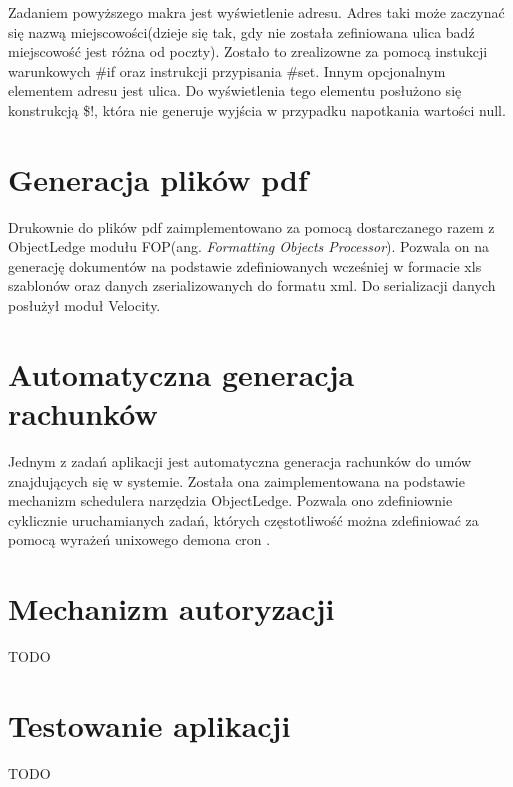 Zadaniem powyższego makra jest wyświetlenie adresu. Adres taki może zaczynać się nazwą miejscowości(dzieje się tak, gdy nie została zefiniowana ulica badź miejscowość jest różna od poczty). Zostało to zrealizowne za pomocą instukcji warunkowych \#if oraz instrukcji przypisania \#set. Innym opcjonalnym elementem adresu jest ulica. Do wyświetlenia tego elementu posłużono się konstrukcją \$!, która nie generuje wyjścia w przypadku napotkania wartości null.

\section[Generacja plików pdf][Generacja plików pdf]{Generacja plików pdf}
Drukownie do plików pdf zaimplementowano za pomocą dostarczanego razem z ObjectLedge modułu FOP(ang. \textit{Formatting Objects Processor}). Pozwala on na generację dokumentów na podstawie zdefiniowanych wcześniej w formacie xls szablonów oraz danych zserializowanych do formatu xml. Do serializacji danych posłużył moduł Velocity.

\section[Automatyczna generacja rachunków][Automatyczna generacja rachunków]{Automatyczna generacja rachunków}
Jednym z zadań aplikacji jest automatyczna generacja rachunków do umów znajdujących się w systemie. Została ona zaimplementowana na podstawie mechanizm schedulera narzędzia ObjectLedge. Pozwala ono zdefiniownie cyklicznie uruchamianych zadań, których częstotliwość można zdefiniować za pomocą wyrażeń unixowego demona cron \cite{link do man cron}. 

\section[Mechanizm autoryzacji][Mechanizm autoryzacji]{Mechanizm autoryzacji}

TODO

\section[Testowanie aplikacji][Testowanie aplikacji]{Testowanie aplikacji}

TODO

